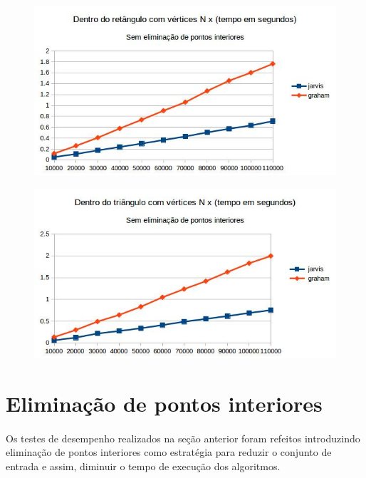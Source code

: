 \documentclass[11pt,a4paper]{article}
\begin{document}
        \begin{figure}[!htb]
                \captionsetup{justification=centering,margin=2cm}
            \centering
              \begin{minipage}[b]{\textwidth}
              \centering
                  \includegraphics[width=\linewidth]{graph_vertices_retangulo_no}
                  \label{fig:map}
                \end{minipage}
              \begin{minipage}[b]{\textwidth}
              \centering
                  \includegraphics[width=\linewidth]{graph_vertices_triangulo_no}
                  \label{fig:map}
                \end{minipage}
                \caption{}
                \label{fig:vertices}
        \end{figure}


\clearpage
    \section{Eliminação de pontos interiores}
    \paragraph{}
    Os testes de desempenho realizados na seção anterior foram refeitos introduzindo eliminação de pontos interiores como estratégia para reduzir o conjunto de entrada e assim, diminuir o tempo de execução dos algoritmos.
\end{document}
